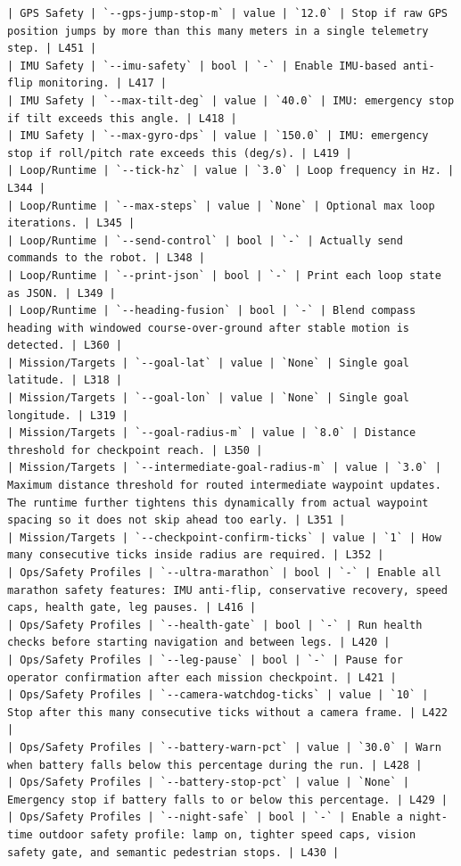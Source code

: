 \documentclass[11pt]{article}
\begin{document}
\begin{lstlisting}
| GPS Safety | `--gps-jump-stop-m` | value | `12.0` | Stop if raw GPS position jumps by more than this many meters in a single telemetry step. | L451 |
| IMU Safety | `--imu-safety` | bool | `-` | Enable IMU-based anti-flip monitoring. | L417 |
| IMU Safety | `--max-tilt-deg` | value | `40.0` | IMU: emergency stop if tilt exceeds this angle. | L418 |
| IMU Safety | `--max-gyro-dps` | value | `150.0` | IMU: emergency stop if roll/pitch rate exceeds this (deg/s). | L419 |
| Loop/Runtime | `--tick-hz` | value | `3.0` | Loop frequency in Hz. | L344 |
| Loop/Runtime | `--max-steps` | value | `None` | Optional max loop iterations. | L345 |
| Loop/Runtime | `--send-control` | bool | `-` | Actually send commands to the robot. | L348 |
| Loop/Runtime | `--print-json` | bool | `-` | Print each loop state as JSON. | L349 |
| Loop/Runtime | `--heading-fusion` | bool | `-` | Blend compass heading with windowed course-over-ground after stable motion is detected. | L360 |
| Mission/Targets | `--goal-lat` | value | `None` | Single goal latitude. | L318 |
| Mission/Targets | `--goal-lon` | value | `None` | Single goal longitude. | L319 |
| Mission/Targets | `--goal-radius-m` | value | `8.0` | Distance threshold for checkpoint reach. | L350 |
| Mission/Targets | `--intermediate-goal-radius-m` | value | `3.0` | Maximum distance threshold for routed intermediate waypoint updates. The runtime further tightens this dynamically from actual waypoint spacing so it does not skip ahead too early. | L351 |
| Mission/Targets | `--checkpoint-confirm-ticks` | value | `1` | How many consecutive ticks inside radius are required. | L352 |
| Ops/Safety Profiles | `--ultra-marathon` | bool | `-` | Enable all marathon safety features: IMU anti-flip, conservative recovery, speed caps, health gate, leg pauses. | L416 |
| Ops/Safety Profiles | `--health-gate` | bool | `-` | Run health checks before starting navigation and between legs. | L420 |
| Ops/Safety Profiles | `--leg-pause` | bool | `-` | Pause for operator confirmation after each mission checkpoint. | L421 |
| Ops/Safety Profiles | `--camera-watchdog-ticks` | value | `10` | Stop after this many consecutive ticks without a camera frame. | L422 |
| Ops/Safety Profiles | `--battery-warn-pct` | value | `30.0` | Warn when battery falls below this percentage during the run. | L428 |
| Ops/Safety Profiles | `--battery-stop-pct` | value | `None` | Emergency stop if battery falls to or below this percentage. | L429 |
| Ops/Safety Profiles | `--night-safe` | bool | `-` | Enable a night-time outdoor safety profile: lamp on, tighter speed caps, vision safety gate, and semantic pedestrian stops. | L430 |

\end{lstlisting}
\end{document}
